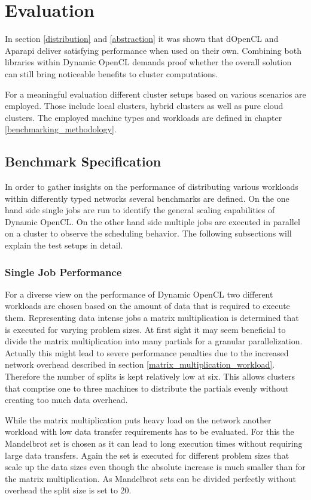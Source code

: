 \chapter{Evaluation}
\label{evaluation}
In section \ref{distribution} and \ref{abstraction} it was shown that dOpenCL and Aparapi deliver satisfying performance when used on their own. Combining both libraries within Dynamic OpenCL demands proof whether the overall solution can still bring noticeable benefits to cluster computations.

For a meaningful evaluation different cluster setups based on various scenarios are employed. Those include local clusters, hybrid clusters as well as pure cloud clusters. The employed machine types and workloads are defined in chapter \ref{benchmarking_methodology}.

\section{Benchmark Specification}

In order to gather insights on the performance of distributing various workloads within differently typed networks several benchmarks are defined. On the one hand side single jobs are run to identify the general scaling capabilities of Dynamic OpenCL. On the other hand side multiple jobs are executed in parallel on a cluster to observe the scheduling behavior. The following subsections will explain the test setups in detail.

\subsection{Single Job Performance}

For a diverse view on the performance of Dynamic OpenCL two different workloads are chosen based on the amount of data that is required to execute them. Representing data intense jobs a matrix multiplication is determined that is executed for varying problem sizes. At first sight it may seem beneficial to divide the matrix multiplication into many partials for a granular parallelization. Actually this might lead to severe performance penalties due to the increased network overhead described in section \ref{matrix_multiplication_workload}. Therefore the number of splits is kept relatively low at six. This allows clusters that comprise one to three machines to distribute the partials evenly without creating too much data overhead.

While the matrix multiplication puts heavy load on the network another workload with low data transfer requirements has to be evaluated. For this the Mandelbrot set is chosen as it can lead to long execution times without requiring large data transfers. Again the set is executed for different problem sizes that scale up the data sizes even though the absolute increase is much smaller than for the matrix multiplication. As Mandelbrot sets can be divided perfectly without overhead the split size is set to 20.

